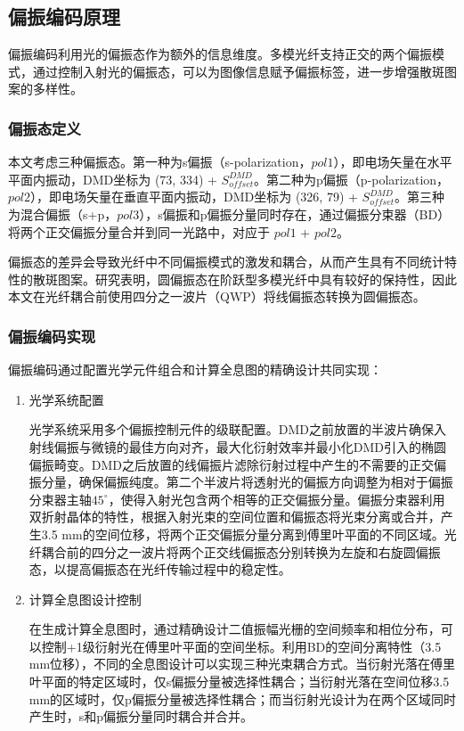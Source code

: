{\subsection{偏振编码原理}\label{sec:polarization_encoding}

偏振编码利用光的偏振态作为额外的信息维度。多模光纤支持正交的两个偏振模式，通过控制入射光的偏振态，可以为图像信息赋予偏振标签，进一步增强散斑图案的多样性。

\subsubsection{偏振态定义}

本文考虑三种偏振态。第一种为s偏振（s-polarization，\( pol1 \)），即电场矢量在水平平面内振动，DMD坐标为 (73, 334) + \(S_{offset}^{DMD}\)。第二种为p偏振（p-polarization，\( pol2 \)），即电场矢量在垂直平面内振动，DMD坐标为 (326, 79) + \(S_{offset}^{DMD}\)。第三种为混合偏振（s+p，\( pol3 \)），s偏振和p偏振分量同时存在，通过偏振分束器（BD）将两个正交偏振分量合并到同一光路中，对应于 \( pol1 \) + \( pol2 \)。

偏振态的差异会导致光纤中不同偏振模式的激发和耦合，从而产生具有不同统计特性的散斑图案。研究表明，圆偏振态在阶跃型多模光纤中具有较好的保持性\citep{ploschner2015seeing}，因此本文在光纤耦合前使用四分之一波片（QWP）将线偏振态转换为圆偏振态。

\subsubsection{偏振编码实现}

偏振编码通过配置光学元件组合和计算全息图的精确设计共同实现：
\begin{enumerate}
\item 光学系统配置

光学系统采用多个偏振控制元件的级联配置。DMD之前放置的半波片确保入射线偏振与微镜的最佳方向对齐，最大化衍射效率并最小化DMD引入的椭圆偏振畸变。DMD之后放置的线偏振片滤除衍射过程中产生的不需要的正交偏振分量，确保偏振纯度。第二个半波片将透射光的偏振方向调整为相对于偏振分束器主轴$45^\circ$，使得入射光包含两个相等的正交偏振分量。偏振分束器利用双折射晶体的特性，根据入射光束的空间位置和偏振态将光束分离或合并，产生3.5 mm的空间位移，将两个正交偏振分量分离到傅里叶平面的不同区域。光纤耦合前的四分之一波片将两个正交线偏振态分别转换为左旋和右旋圆偏振态，以提高偏振态在光纤传输过程中的稳定性。

\item 计算全息图设计控制

在生成计算全息图时，通过精确设计二值振幅光栅的空间频率和相位分布，可以控制+1级衍射光在傅里叶平面的空间坐标。利用BD的空间分离特性（3.5 mm位移），不同的全息图设计可以实现三种光束耦合方式。当衍射光落在傅里叶平面的特定区域时，仅s偏振分量被选择性耦合；当衍射光落在空间位移3.5 mm的区域时，仅p偏振分量被选择性耦合；而当衍射光设计为在两个区域同时产生时，s和p偏振分量同时耦合并合并。
\end{enumerate}

}
